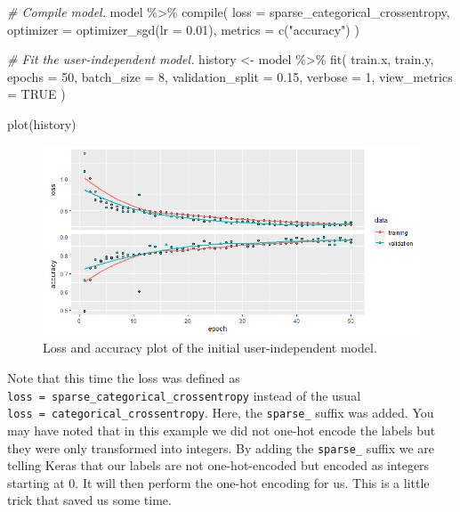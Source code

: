 \documentclass[
  11pt,
]{krantz}
\makeatletter
\newenvironment{Shaded}{\begin{snugshade}}{\end{snugshade}}
\newcommand{\AttributeTok}[1]{\textcolor[rgb]{0.61,0.61,0.61}{#1}}
\newcommand{\CommentTok}[1]{\textcolor[rgb]{0.37,0.37,0.37}{\textit{#1}}}
\newcommand{\ConstantTok}[1]{\textcolor[rgb]{0,0,0}{#1}}
\newcommand{\DecValTok}[1]{\textcolor[rgb]{0.06,0.06,0.06}{#1}}
\newcommand{\FloatTok}[1]{\textcolor[rgb]{0.06,0.06,0.06}{#1}}
\newcommand{\FunctionTok}[1]{\textcolor[rgb]{0,0,0}{#1}}
\newcommand{\NormalTok}[1]{#1}
\newcommand{\OtherTok}[1]{\textcolor[rgb]{0.37,0.37,0.37}{#1}}
\newcommand{\SpecialCharTok}[1]{\textcolor[rgb]{0,0,0}{#1}}
\newcommand{\StringTok}[1]{\textcolor[rgb]{0.5,0.5,0.5}{#1}}
\newenvironment{kframe}{%
\medskip{}
\setlength{\fboxsep}{.8em}
 \def\at@end@of@kframe{}%
 \ifinner\ifhmode%
  \def\at@end@of@kframe{\end{minipage}}%
  \begin{minipage}{\columnwidth}%
 \fi\fi%
 \def\FrameCommand##1{\hskip\@totalleftmargin \hskip-\fboxsep
 \colorbox{shadecolor}{##1}\hskip-\fboxsep
     \hskip-\linewidth \hskip-\@totalleftmargin \hskip\columnwidth}%
 \MakeFramed {\advance\hsize-\width
   \@totalleftmargin\z@ \linewidth\hsize
   \@setminipage}}%
 {\par\unskip\endMakeFramed%
 \at@end@of@kframe}
\newenvironment{rmdblock}[1]
  {
  \begin{itemize}
  \renewcommand{\labelitemi}{
    \raisebox{-.7\height}[0pt][0pt]{
      {\setkeys{Gin}{width=3em,keepaspectratio}\texttt{[image: images/icons/\#1]}}
    }
  }
  \setlength{\fboxsep}{1em}
  \begin{kframe}
  \item
  }
  {
  \end{kframe}
  \end{itemize}
  }
\newenvironment{rmdinfo}
  {\begin{rmdblock}{info}}
  {\end{rmdblock}}
\makeatother
\begin{document}
\begin{Shaded}
\begin{Highlighting}[]
\CommentTok{\# Compile model.}
\NormalTok{model }\SpecialCharTok{\%\textgreater{}\%} \FunctionTok{compile}\NormalTok{(}
  \AttributeTok{loss =} \StringTok{\textquotesingle{}sparse\_categorical\_crossentropy\textquotesingle{}}\NormalTok{,}
  \AttributeTok{optimizer =} \FunctionTok{optimizer\_sgd}\NormalTok{(}\AttributeTok{lr =} \FloatTok{0.01}\NormalTok{),}
  \AttributeTok{metrics =} \FunctionTok{c}\NormalTok{(}\StringTok{"accuracy"}\NormalTok{)}
\NormalTok{)}

\CommentTok{\# Fit the user{-}independent model.}
\NormalTok{history }\OtherTok{\textless{}{-}}\NormalTok{ model }\SpecialCharTok{\%\textgreater{}\%} \FunctionTok{fit}\NormalTok{(}
\NormalTok{  train.x, train.y,}
  \AttributeTok{epochs =} \DecValTok{50}\NormalTok{,}
  \AttributeTok{batch\_size =} \DecValTok{8}\NormalTok{,}
  \AttributeTok{validation\_split =} \FloatTok{0.15}\NormalTok{,}
  \AttributeTok{verbose =} \DecValTok{1}\NormalTok{,}
  \AttributeTok{view\_metrics =} \ConstantTok{TRUE}
\NormalTok{)}

\FunctionTok{plot}\NormalTok{(history)}
\end{Highlighting}
\end{Shaded}

\begin{figure}

{\centering \includegraphics[width=0.9\linewidth]{images/adapt_loss1} 

}

\caption{Loss and accuracy plot of the initial user-independent model.}\label{fig:adaptLoss1}
\end{figure}

\begin{rmdinfo}
Note that this time the loss was defined as \texttt{loss\ =\ \textquotesingle{}sparse\_categorical\_crossentropy\textquotesingle{}} instead of the usual \texttt{loss\ =\ \textquotesingle{}categorical\_crossentropy\textquotesingle{}}. Here, the \texttt{sparse\_} suffix was added. You may have noted that in this example we did not one-hot encode the labels but they were only transformed into integers. By adding the \texttt{sparse\_} suffix we are telling Keras that our labels are not one-hot-encoded but encoded as integers starting at \(0\). It will then perform the one-hot encoding for us. This is a little trick that saved us some time.
\end{rmdinfo}
\end{document}
